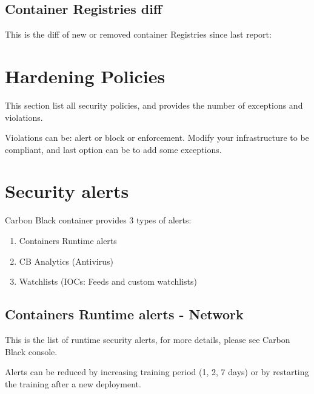 
\vskip15pt

\subsection{Container Registries diff}
This is the diff of new or removed container Registries since last report:
\vskip10pt


\section{Hardening Policies}

This section list all security policies, and provides the number of exceptions and violations.



\begin{importantblock}
	Violations can be: alert or block or \gls{enforcement}. Modify your infrastructure to be compliant, and last option can be to add some exceptions.
\end{importantblock}

\section{Security alerts}

Carbon Black container provides 3 types of alerts:
\begin{enumerate}
  \item Containers Runtime alerts
  \item CB Analytics (Antivirus)
  \item Watchlists (IOCs: Feeds and custom watchlists)
\end{enumerate}

\subsection{Containers Runtime alerts - Network}
\noindent


\vskip10pt

This is the list of runtime security alerts, for more details, please see Carbon Black console.
\vskip10pt



\begin{tipblock}
	Alerts can be reduced by increasing training period (1, 2, 7 days) or by restarting the training after a new deployment.
\end{tipblock}

